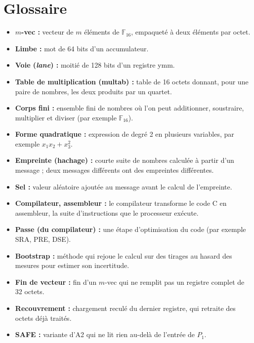 \chapter*{Glossaire}
\label{chap:Glossaire}
\begin{itemize}
\item[•] \textbf{$m$-vec :} vecteur de $m$ éléments de $\mathbb{F}_{16}$, empaqueté à deux éléments par octet.

\item[•] \textbf{Limbe :} mot de 64 bits d'un accumulateur.

\item[•] \textbf{Voie (\emph{lane}) :} moitié de 128 bits d'un registre ymm.

\item[•] \textbf{Table de multiplication (multab) :} table de 16 octets donnant, pour une paire de nombres, les deux produits par un quartet.

\item[•] \textbf{Corps fini :} ensemble fini de nombres où l'on peut additionner, soustraire, multiplier et diviser (par exemple $\mathbb{F}_{16}$).\item \textbf{Forme quadratique :} expression de degré 2 en plusieurs variables, par exemple $x_1x_2+x_3^2$.\item \textbf{Empreinte (hachage) :} courte suite de nombres calculée à partir d'un message ; deux messages différents ont des empreintes différentes.\item \textbf{Sel :} valeur aléatoire ajoutée au message avant le calcul de l'empreinte.\item \textbf{Compilateur, assembleur :} le compilateur transforme le code C en assembleur, la suite d'instructions que le processeur exécute.\item \textbf{Passe (du compilateur) :} une étape d'optimisation du code (par exemple SRA, PRE, DSE).\item \textbf{Bootstrap :} méthode qui rejoue le calcul sur des tirages au hasard des mesures pour estimer son incertitude.\item \textbf{Fin de vecteur :} fin d'un $m$-vec qui ne remplit pas un registre complet de 32 octets.

\item[•] \textbf{Recouvrement :} chargement reculé du dernier registre, qui retraite des octets déjà traités.

\item[•] \textbf{SAFE :} variante d'A2 qui ne lit rien au-delà de l'entrée de $P_1$.


\end{itemize}
